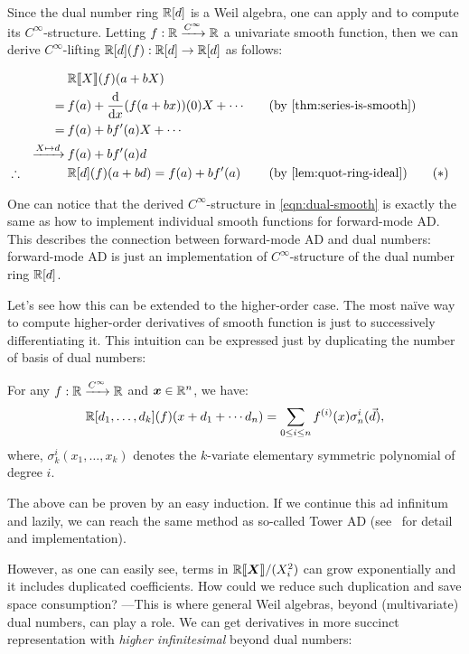 \documentclass[%
  sigconf,authorversion,screen]{acmart}
\begin{document}
Since the dual number ring $\mathbb{R}[d]$ is a Weil algebra, one can apply  and  to compute its $C^\infty$-structure.
Letting $f: \mathbb{R} \xrightarrow{C^\infty} \mathbb{R}$ a univariate smooth function, then we can derive $C^\infty$-lifting $\mathbb{R}[d](f): \mathbb{R}[d] \to \mathbb{R}[d]$ as follows:

\begin{alignat*}{3}
  &&&\R\llbracket{}X\rrbracket(f)(a + bX) \\
  &&=\:&f(a) + \frac{\mathrm d}{\mathrm{d} x}(f(a + bx))(0) X + \cdots
  &\quad&(\text{by \Cref{thm:series-is-smooth}})\\
  &&=\:&f(a) + b f'(a) X + \cdots\\
  &&\xrightarrow{X \mapsto d}\:&f(a) + bf'(a) d\\
  &\therefore&& \R[d](f)(a + bd) = f(a) + b f'(a) 
  && (\text{by \Cref{lem:quot-ring-ideal}}) \tag{\ensuremath{\ast}}
  \label{eqn:dual-smooth}
\end{alignat*}

One can notice that the derived $C^\infty$-structure in \eqref{eqn:dual-smooth} is exactly the same as how to implement individual smooth functions for forward-mode AD.
This describes the connection between forward-mode AD and dual numbers: forward-mode AD is just an implementation of $C^\infty$-structure of the dual number ring $\mathbb{R}[d]$.

Let's see how this can be extended to the higher-order case.
The most naïve way to compute higher-order derivatives of smooth function is just to successively differentiating it.
This intuition can be expressed just by duplicating the number of basis of dual numbers:
\begin{theorem}\label{thm:univ-partial-duals}
  For any $f: \mathbb{R} \xrightarrow{C^\infty} \mathbb{R}$ and $\boldsymbol{x} \in \mathbb{R}^n$, we have:
  \[
    \mathbb{R}[d_1, \dots, d_k](f)(x + d_1 + \cdots d_n) 
    = \sum_{0 \leq i \leq n} f^{(i)}(x)\sigma^i_n(\vec{d}),
  \]
  where, $\sigma^i_k(x_1, \dots, x_k)$ denotes the $k$-variate elementary symmetric polynomial of degree $i$.
\end{theorem}

The above can be proven by an easy induction.
If we continue this ad infinitum and lazily, we can reach the same method as so-called Tower AD (see~\cite{Pearlmutter:2007aa,Kmett:2010aa} for detail and implementation).

However, as one can easily see, terms in $\mathord{\mathbb{R}\llbracket\boldsymbol{X}\rrbracket}/(X_i^2)$ can grow exponentially and it includes duplicated coefficients.
How could we reduce such duplication and save space consumption? ---This is where general Weil algebras, beyond (multivariate) dual numbers, can play a role.
We can get derivatives in more succinct representation with \emph{higher infinitesimal} beyond dual numbers:
\end{document}
